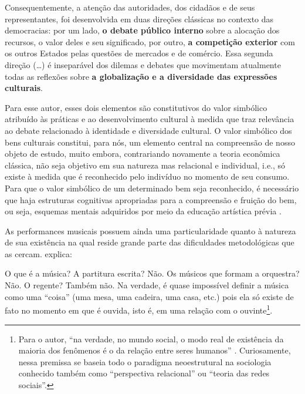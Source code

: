 \documentclass[a4paper, 12pt, openright, oneside, german, french, english, brazil]{abntex2}
\begin{document}
	\begin{citacao}
		Consequentemente, a atenção das autoridades, dos cidadãos e de seus representantes, foi desenvolvida em duas direções clássicas no contexto das democracias: por um lado, \textbf{o debate público interno} sobre a alocação dos recursos, o valor deles e seu significado, por outro, \textbf{a competição exterior} com os outros Estados pelas questões de mercados e de comércio. Essa segunda direção (\ldots) é inseparável dos dilemas e debates que movimentam atualmente todas as reflexões sobre \textbf{a globalização e a diversidade das expressões culturais}. \cite[p. 71-2]{tolila2007cultura}
	\end{citacao}
	
	Para esse autor, esses dois elementos são constitutivos do valor simbólico atribuído às práticas e ao desenvolvimento cultural à medida que traz relevância ao debate relacionado à identidade e diversidade cultural. O valor simbólico dos bens culturais constitui, para nós, um elemento central na compreensão de nosso objeto de estudo, muito embora, contrariando novamente a teoria econômica clássica, não seja objetivo em sua natureza mas relacional e individual, i.e., só existe à medida que é reconhecido pelo indivíduo no momento de seu consumo. Para que o valor simbólico de um determinado bem seja reconhecido, é necessário que haja estruturas cognitivas apropriadas para a compreensão e fruição do bem, ou seja, esquemas mentais adquiridos por meio da educação artística prévia \cite{bourdieu2003amor}.
	
	As performances musicais possuem ainda uma particularidade quanto à natureza de sua existência na qual reside grande parte das dificuldades metodológicas que as cercam.  explica:
	
	\begin{citacao}
		O que é a música? A partitura escrita? Não. Os músicos que formam a orquestra? Não. O regente? Também não. Na verdade, é quase impossível definir a música como uma ``coisa'' (uma mesa, uma cadeira, uma casa, etc.) pois ela só existe de fato no momento em que é ouvida, isto é, em uma relação com o ouvinte\footnote{Para o autor, ``na verdade, no mundo social, o modo real de existência da maioria dos fenômenos é o da relação entre seres humanos'' \cite[p. 110]{tolila2007cultura}. Curiosamente, nessa premissa se baseia todo o paradigma neoestrutural na sociologia conhecido também como ``perspectiva relacional'' ou ``teoria das redes sociais''.}. \cite[p. 109]{tolila2007cultura}
	\end{citacao}
	
\end{document}
